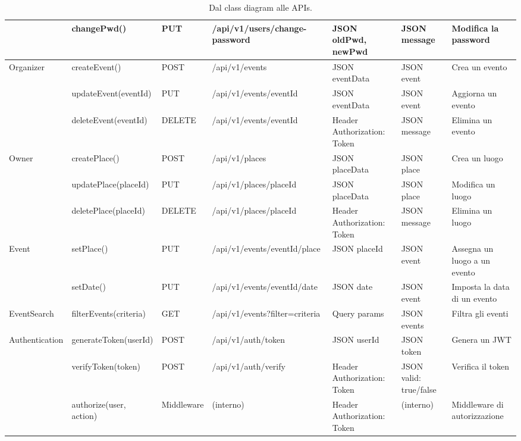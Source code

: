 \documentclass[9pt]{extarticle}
\begin{document}
\begin{table}[!htb]
{\begin{tabular}{lllllll}
	& changePwd()                          & PUT         & /api/v1/users/change-password     & JSON {oldPwd, newPwd}          & JSON {message}                   & Modifica la password \\ \midrule
	Organizer       & createEvent()                        & POST        & /api/v1/events                    & JSON {eventData}               & JSON {event}                     & Crea un evento \\
	& updateEvent(eventId)                 & PUT         & /api/v1/events/{eventId}          & JSON {eventData}               & JSON {event}                     & Aggiorna un evento \\
	& deleteEvent(eventId)                 & DELETE      & /api/v1/events/{eventId}          & Header {Authorization: Token}  & JSON {message}                   & Elimina un evento \\ \midrule
	Owner           & createPlace()                        & POST        & /api/v1/places                    & JSON {placeData}               & JSON {place}                     & Crea un luogo \\
	& updatePlace(placeId)                 & PUT         & /api/v1/places/{placeId}          & JSON {placeData}               & JSON {place}                     & Modifica un luogo \\
	& deletePlace(placeId)                 & DELETE      & /api/v1/places/{placeId}          & Header {Authorization: Token}  & JSON {message}                   & Elimina un luogo \\ \midrule
	Event           & setPlace()                           & PUT         & /api/v1/events/{eventId}/place    & JSON {placeId}                 & JSON {event}                     & Assegna un luogo a un evento \\
	& setDate()                            & PUT         & /api/v1/events/{eventId}/date     & JSON {date}                    & JSON {event}                     & Imposta la data di un evento \\ \midrule
	EventSearch     & filterEvents(criteria)               & GET         & /api/v1/events?filter={criteria}  & Query params                   & JSON {events}                    & Filtra gli eventi \\ \midrule
	
	Authentication  & generateToken(userId)                & POST        & /api/v1/auth/token                & JSON {userId}                  & JSON {token}                     & Genera un JWT \\
	& verifyToken(token)                   & POST        & /api/v1/auth/verify               & Header {Authorization: Token}  & JSON {valid: true/false}         & Verifica il token \\
	& authorize(user, action)              & Middleware  & (interno)                         & Header {Authorization: Token}  & (interno)                        & Middleware di autorizzazione \\ \bottomrule
\end{tabular}%
}
\caption{Dal class diagram alle APIs.}
\label{tab:class2API}
\end{table}
\end{document}

